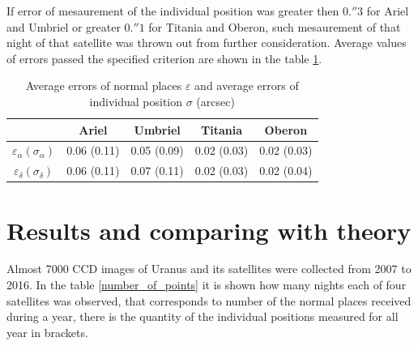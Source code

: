 \documentclass[]{article}
\begin{document}
If error of mesaurement of the individual position was greater then $0.''3$ for Ariel and Umbriel or greater $0.''1$ for Titania and Oberon, such mesaurement of that night of that satellite was thrown out from further consideration. Average values of errors passed the specified criterion are shown in the table \ref{errors}.\par
\begin{table}[h!]
\caption{Average errors of normal places $\varepsilon$ and average errors of individual position $\sigma$ (arcsec)}
\label{errors}
\begin{center}
\begin{tabular}{|c|c|c|c|c|}
\hline
&Ariel&Umbriel&Titania&Oberon \\
\hline
$\varepsilon_\alpha (\sigma_\alpha)$&0.06 (0.11)&0.05 (0.09)&0.02 (0.03)&0.02 (0.03) \\
$\varepsilon_\delta (\sigma_\delta)$&0.06 (0.11)&0.07 (0.11)&0.02 (0.03)&0.02 (0.04) \\
\hline
\end{tabular}
\end{center}
\end{table}



\section{Results and comparing with theory}
Almost 7000 CCD images of Uranus and its satellites were collected from 2007 to 2016. In the table \ref{number_of_points} it is shown how many nights each of four satellites was observed, that corresponds to number of the normal places received during a year, there is the quantity of the individual positions measured for all year in brackets.\par
\end{document}
